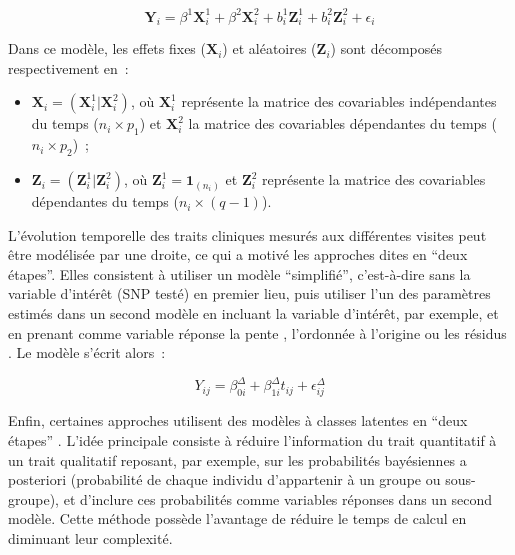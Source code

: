 \documentclass[11pt,a4paper,notrimn]{krantz}
\theoremstyle{definition}
\theoremstyle{definition}
\theoremstyle{remark}
\begin{document}
\begin{equation}\boldsymbol{Y}_i=\beta^1 \boldsymbol{X}_i^1+\beta^2 \boldsymbol{X}_i^2+b_i^1 \boldsymbol{Z}_i^1+b_i^2 \boldsymbol{Z}_i^2+\epsilon_i\label{eq:cLMM}\end{equation}

Dans ce modèle, les effets fixes (\(\boldsymbol{X}_i\)) et aléatoires
(\(\boldsymbol{Z}_i\)) sont décomposés respectivement en~:

\begin{itemize}
\item
  \(\boldsymbol{X}_i=(\boldsymbol{X}_i^1|\boldsymbol{X}_i^2)\), où
  \(\boldsymbol{X}_i^1\) représente la matrice des covariables
  indépendantes du temps (\(n_i\times p_1\)) et \(\boldsymbol{X}_i^2\)
  la matrice des covariables dépendantes du temps (\(n_i\times p_2\))~;
\item
  \(\boldsymbol{Z}_i=(\boldsymbol{Z}_i^1|\boldsymbol{Z}_i^2)\), où
  \(\boldsymbol{Z}_i^1=\boldsymbol{1}_{(n_i)}\) et
  \(\boldsymbol{Z}_i^2\) représente la matrice des covariables
  dépendantes du temps (\(n_i\times (q-1)\)).
\end{itemize}

L'évolution temporelle des traits cliniques mesurés aux différentes
visites peut être modélisée par une droite, ce qui a motivé les
approches dites en ``deux étapes''. Elles consistent à utiliser un
modèle ``simplifié'', c'est-à-dire sans la variable d'intérêt (SNP
testé) en premier lieu, puis utiliser l'un des paramètres estimés dans
un second modèle en incluant la variable d'intérêt, par exemple, et en
prenant comme variable réponse la pente \citep{sikorska_fast_2013},
l'ordonnée à l'origine \citep{wang_sample_2014} ou les résidus
\citep{hossain_analysis_2014}. Le modèle s'écrit alors~:

\begin{equation}Y_{ij}=\beta_{0i}^\Delta+\beta_{1i}^\Delta t_{ij}+\epsilon_{ij}^\Delta\label{eq:LMMshort}\end{equation}

Enfin, certaines approches utilisent des modèles à classes latentes en
``deux étapes'' \citep{roslin_genome-wide_2009, musolf_mapping_2014}.
L'idée principale consiste à réduire l'information du trait quantitatif
à un trait qualitatif reposant, par exemple, sur les probabilités
bayésiennes a posteriori (probabilité de chaque individu d'appartenir à
un groupe ou sous-groupe), et d'inclure ces probabilités comme variables
réponses dans un second modèle. Cette méthode possède l'avantage de
réduire le temps de calcul en diminuant leur complexité.
\end{document}
